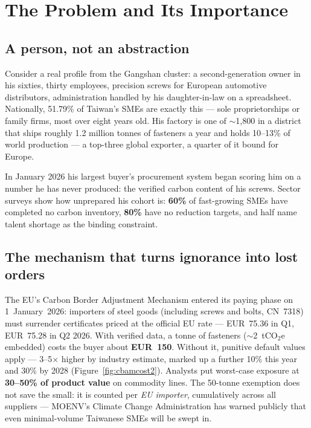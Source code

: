 \section{The Problem and Its Importance}\label{sec:problem}

\subsection{A person, not an abstraction}

Consider a real profile from the Gangshan cluster: a second-generation owner in
his sixties, thirty employees, precision screws for European automotive
distributors, administration handled by his daughter-in-law on a spreadsheet.
Nationally, 51.79\% of Taiwan's SMEs are exactly this --- sole proprietorships
or family firms, most over eight years old\cite{moea}. His factory is one of
$\sim$1,800 in a district that ships roughly 1.2 million tonnes of fasteners a
year and holds 10--13\% of world production --- a top-three global
exporter\cite{ktimes,goebel}, a quarter of it bound for Europe\cite{cw}.

In January 2026 his largest buyer's procurement system began scoring him on a
number he has never produced: the verified carbon content of his screws. Sector
surveys show how unprepared his cohort is: \textbf{60\%} of fast-growing SMEs
have completed no carbon inventory, \textbf{80\%} have no reduction targets,
and half name talent shortage as the binding constraint\cite{cw}.

\subsection{The mechanism that turns ignorance into lost orders}

The EU's Carbon Border Adjustment Mechanism entered its paying phase on
1~January~2026: importers of steel goods (including screws and bolts, CN~7318)
must surrender certificates priced at the official EU rate --- EUR~75.36 in
Q1, EUR~75.28 in Q2 2026\cite{taxud,ecprice,carbonchain}. With verified data,
a tonne of fasteners ($\sim$2~tCO$_2$e embedded\cite{specialinsert}) costs the
buyer about \textbf{EUR~150}. Without it, punitive default values apply ---
3--5$\times$ higher by industry estimate, marked up a further 10\% this year
and 30\% by 2028\cite{omm,specialinsert} (Figure~\ref{fig:cbamcost2}). Analysts
put worst-case exposure at \textbf{30--50\% of product value} on commodity
lines\cite{specialinsert}. The 50-tonne exemption does not save the small: it
is counted per \emph{EU importer}, cumulatively across all suppliers ---
MOENV's Climate Change Administration has warned publicly that even
minimal-volume Taiwanese SMEs will be swept in\cite{tpt-cbam}.

